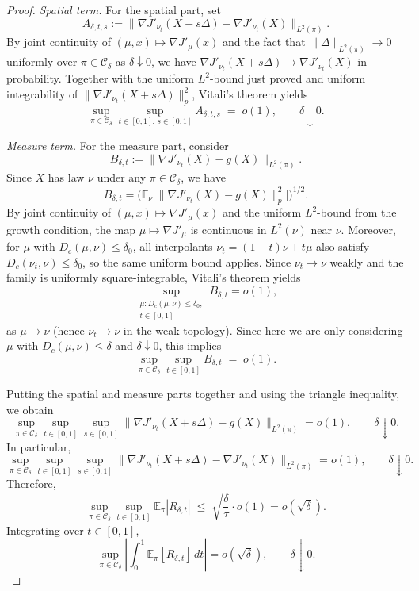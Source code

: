 \documentclass[11pt]{article}
\theoremstyle{definition}
\newcommand{\E}{\mathbb{E}}
\begin{document}
\begin{proof}
\smallskip
\emph{Spatial term.}
For the spatial part, set
\[
  A_{\delta,t,s}
  := \big\|\nabla J'_{\nu_t}(X+s\Delta)-\nabla J'_{\nu_t}(X)\big\|_{L^2(\pi)}.
\]
By joint continuity of $(\mu,x)\mapsto\nabla J'_\mu(x)$ and the fact that
$\|\Delta\|_{L^2(\pi)}\to 0$ uniformly over $\pi\in\mathcal{C}_\delta$ as $\delta\downarrow 0$,
we have $\nabla J'_{\nu_t}(X+s\Delta)\to\nabla J'_{\nu_t}(X)$ in probability.
Together with the uniform $L^2$-bound just proved and uniform integrability of
$\|\nabla J'_{\nu_t}(X+s\Delta)\|_p^2$, Vitali's theorem yields
\[
  \sup_{\pi\in\mathcal{C}_\delta}
  \sup_{t\in[0,1],\,s\in[0,1]}
  A_{\delta,t,s}
  \;=\; o(1),
  \qquad \delta\downarrow 0.
\]

\smallskip
\emph{Measure term.}
For the measure part, consider
\[
  B_{\delta,t}
  := \big\|\nabla J'_{\nu_t}(X)-g(X)\big\|_{L^2(\pi)}.
\]
Since $X$ has law $\nu$ under any $\pi\in\mathcal{C}_\delta$, we have
\[
  B_{\delta,t}
  = \Big(\E_\nu\big[\|\nabla J'_{\nu_t}(X)-g(X)\|_p^2\big]\Big)^{1/2}.
\]
By joint continuity of $(\mu,x)\mapsto\nabla J'_\mu(x)$ and the uniform $L^2$-bound
from the growth condition, the map
$\mu\mapsto\nabla J'_\mu$ is continuous in $L^2(\nu)$ near $\nu$.
Moreover, for $\mu$ with $D_c(\mu,\nu)\le\delta_0$, all interpolants
$\nu_t=(1-t)\nu+t\mu$ also satisfy $D_c(\nu_t,\nu)\le\delta_0$, so the same
uniform bound applies. Since $\nu_t\to\nu$ weakly and the family is uniformly
square-integrable, Vitali's theorem yields
\[
  \sup_{\substack{\mu:D_c(\mu,\nu)\le\delta_0,\\ t\in[0,1]}}
  B_{\delta,t}
  = o(1),
\]
as $\mu\to\nu$ (hence $\nu_t\to\nu$ in the weak topology). Since here
we are only considering $\mu$ with $D_c(\mu,\nu)\le\delta$ and $\delta\downarrow 0$,
this implies
\[
  \sup_{\pi\in\mathcal{C}_\delta}\sup_{t\in[0,1]} B_{\delta,t}
  \;=\; o(1).
\]

\smallskip
Putting the spatial and measure parts together and using the triangle inequality, we obtain
\[
  \sup_{\pi\in\mathcal{C}_\delta}
  \sup_{t\in[0,1]}
  \sup_{s\in[0,1]}
  \big\|\nabla J'_{\nu_t}(X+s\Delta)-g(X)\big\|_{L^2(\pi)}
  = o(1),
  \qquad \delta\downarrow 0.
\]
In particular,
\[
  \sup_{\pi\in\mathcal{C}_\delta}
  \sup_{t\in[0,1]}
  \sup_{s\in[0,1]}
  \big\|\nabla J'_{\nu_t}(X+s\Delta)-\nabla J'_{\nu_t}(X)\big\|_{L^2(\pi)}
  = o(1),
  \qquad \delta\downarrow 0.
\]
Therefore,
\[
  \sup_{\pi\in\mathcal{C}_\delta}
  \sup_{t\in[0,1]}
  \E_\pi|R_{\delta,t}|
  \;\le\;
  \sqrt{\frac{\delta}{\tau}}\cdot o(1)
  = o(\sqrt{\delta}).
\]
Integrating over $t\in[0,1]$,
\[
  \sup_{\pi\in\mathcal{C}_\delta}
  \left|
    \int_0^1 \E_\pi[R_{\delta,t}]\,dt
  \right|
  = o(\sqrt{\delta}),
  \qquad \delta\downarrow 0.
\]


\end{proof}
\end{document}
